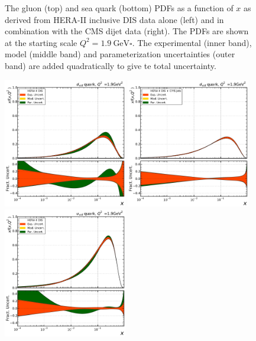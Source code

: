\begin{figure}[tbp]
  \caption[The gluon and sea quark PDFs]{The gluon (top) and sea quark (bottom) PDFs as a function of $x$ as
  derived from HERA-II inclusive DIS data alone (left) and in combination with
  the CMS dijet data (right). The PDFs are shown at the starting scale $Q^2 =
  \SI{1.9}{\GeV \square}$. The experimental (inner band), model (middle band)
  and parameterization uncertainties (outer band) are added quadratically to give
  te total uncertainty.}
  \label{fig:pdfconstraints:split:gluonqsea:19}
\end{figure}

\begin{figure}[tbp]
  \centering
  \includegraphics[width=0.48\textwidth]{figures/pdf_constraints/hftd/HFTD_HERA_V017_EIG/pdfratio/HFTD_HERA_V017_EIG_7_1_9.pdf}\hfill%
  \includegraphics[width=0.48\textwidth]{figures/pdf_constraints/hftd/HFTD_HERACMSTDJETS_V017_EIG/pdfratio/HFTD_HERACMSTDJETS_V017_EIG_7_1_9.pdf}
  \includegraphics[width=0.48\textwidth]{figures/pdf_constraints/hftd/HFTD_HERA_V017_EIG/pdfratio/HFTD_HERA_V017_EIG_8_1_9.pdf}\hfill%

\end{figure}
